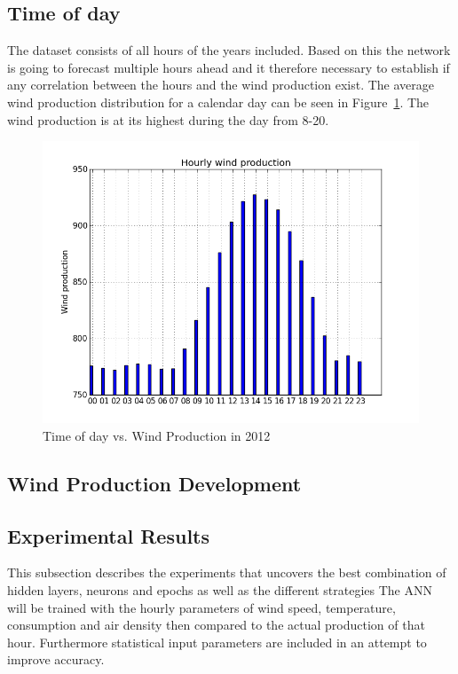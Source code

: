 \subsection{Time of day}
The dataset consists of all hours of the years included. Based on this the network is going to forecast multiple hours ahead and it therefore necessary to establish if any correlation between the hours and the wind production exist. The average wind production distribution for a calendar day can be seen in Figure~\ref{fig:hourly_wind_production}. The wind production is at its highest during the day from 8-20.  

\begin{figure}[H]
\centering
\includegraphics[width=0.99\linewidth,natwidth=898,natheight=587]{billeder/hourly_wind_production.png}
\caption{Time of day vs. Wind Production in 2012}
\label{fig:hourly_wind_production}
\end{figure}

\subsection{Wind Production Development}


\subsection{Experimental Results}
This subsection describes the experiments that uncovers the best combination of hidden layers, neurons and epochs as well as the different strategies The ANN will be trained with the hourly parameters of wind speed, temperature, consumption and air density then compared to the actual production of that hour. Furthermore statistical input parameters are included in an attempt to improve accuracy. 

